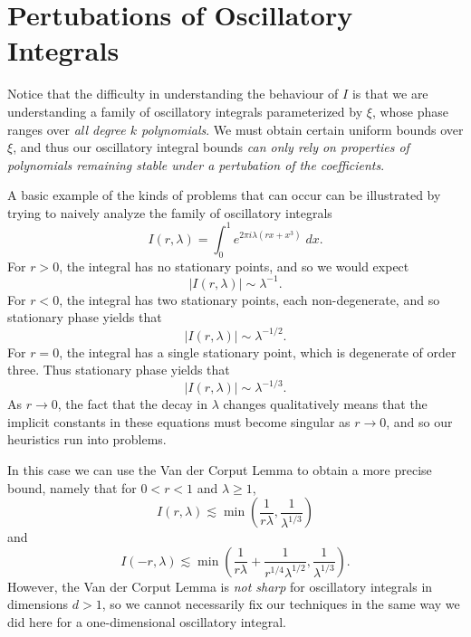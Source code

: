 	\section{Pertubations of Oscillatory Integrals}

	Notice that the difficulty in understanding the behaviour of $I$ is that we are understanding a family of oscillatory integrals parameterized by $\xi$, whose phase ranges over \emph{all degree $k$ polynomials}. We must obtain certain uniform bounds over $\xi$, and thus our oscillatory integral bounds \emph{can only rely on properties of polynomials remaining stable under a pertubation of the coefficients}.

	A basic example of the kinds of problems that can occur can be illustrated by trying to naively analyze the family of oscillatory integrals
	\[ I(r,\lambda) = \int_0^1 e^{2\pi i \lambda (rx + x^3)}\; dx. \]
	For $r > 0$, the integral has no stationary points, and so we would expect
	\[ |I(r,\lambda)| \sim \lambda^{-1}. \]
	For $r < 0$, the integral has two stationary points, each non-degenerate, and so stationary phase yields that
	\[ |I(r,\lambda)| \sim \lambda^{-1/2}. \]
	For $r = 0$, the integral has a single stationary point, which is degenerate of order three. Thus stationary phase yields that
	\[ |I(r,\lambda)| \sim \lambda^{-1/3}. \]
	As $r \to 0$, the fact that the decay in $\lambda$ changes qualitatively means that the implicit constants in these equations must become singular as $r \to 0$, and so our heuristics run into problems.

	In this case we can use the Van der Corput Lemma to obtain a more precise bound, namely that for $0 < r < 1$ and $\lambda \geq 1$,
	\[ I(r,\lambda) \lesssim \min \left( \frac{1}{r\lambda}, \frac{1}{\lambda^{1/3}} \right) \]
	and
	\[ I(-r,\lambda) \lesssim \min \left( \frac{1}{r\lambda} + \frac{1}{r^{1/4} \lambda^{1/2}}, \frac{1}{\lambda^{1/3}} \right). \]
	However, the Van der Corput Lemma is \emph{not sharp} for oscillatory integrals in dimensions $d > 1$, so we cannot necessarily fix our techniques in the same way we did here for a one-dimensional oscillatory integral.

